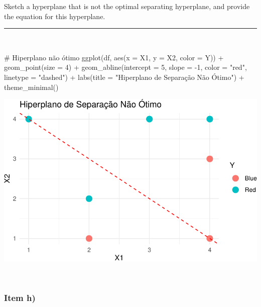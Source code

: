 \documentclass[
  a4paperpaper,
]{article}
\newenvironment{Shaded}{\begin{snugshade}}{\end{snugshade}}
\newcommand{\AttributeTok}[1]{\textcolor[rgb]{0.40,0.45,0.13}{#1}}
\newcommand{\CommentTok}[1]{\textcolor[rgb]{0.37,0.37,0.37}{#1}}
\newcommand{\DecValTok}[1]{\textcolor[rgb]{0.68,0.00,0.00}{#1}}
\newcommand{\FunctionTok}[1]{\textcolor[rgb]{0.28,0.35,0.67}{#1}}
\newcommand{\NormalTok}[1]{\textcolor[rgb]{0.00,0.23,0.31}{#1}}
\newcommand{\SpecialCharTok}[1]{\textcolor[rgb]{0.37,0.37,0.37}{#1}}
\newcommand{\StringTok}[1]{\textcolor[rgb]{0.13,0.47,0.30}{#1}}
\begin{document}
Sketch a hyperplane that is not the optimal separating hyperplane, and
provide the equation for this hyperplane.

\begin{center}\rule{0.5\linewidth}{0.5pt}\end{center}

~

\begin{Shaded}
\begin{Highlighting}[]
\CommentTok{\# Hiperplano não ótimo}
\FunctionTok{ggplot}\NormalTok{(df, }\FunctionTok{aes}\NormalTok{(}\AttributeTok{x =}\NormalTok{ X1, }\AttributeTok{y =}\NormalTok{ X2, }\AttributeTok{color =}\NormalTok{ Y)) }\SpecialCharTok{+}
  \FunctionTok{geom\_point}\NormalTok{(}\AttributeTok{size =} \DecValTok{4}\NormalTok{) }\SpecialCharTok{+}
  \FunctionTok{geom\_abline}\NormalTok{(}\AttributeTok{intercept =} \DecValTok{5}\NormalTok{, }\AttributeTok{slope =} \SpecialCharTok{{-}}\DecValTok{1}\NormalTok{, }\AttributeTok{color =} \StringTok{"red"}\NormalTok{, }\AttributeTok{linetype =} \StringTok{"dashed"}\NormalTok{) }\SpecialCharTok{+}
  \FunctionTok{labs}\NormalTok{(}\AttributeTok{title =} \StringTok{"Hiperplano de Separação Não Ótimo"}\NormalTok{) }\SpecialCharTok{+}
  \FunctionTok{theme\_minimal}\NormalTok{()}
\end{Highlighting}
\end{Shaded}

\includegraphics{lista-5_files/figure-pdf/unnamed-chunk-12-1.pdf}

~

\subsubsection{Item h)}\label{item-h}
\end{document}
